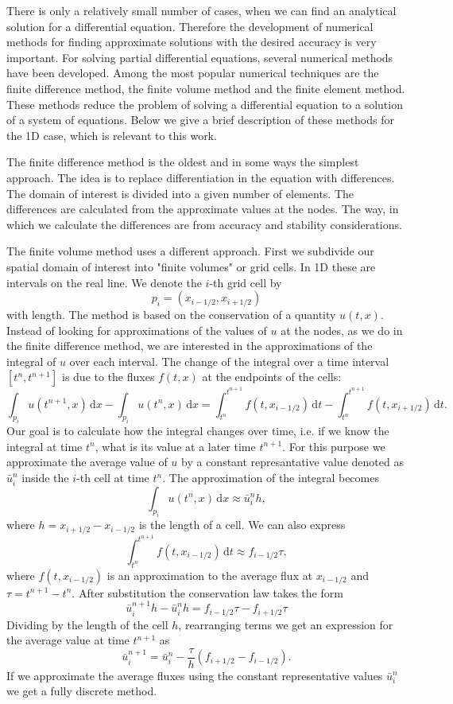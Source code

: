 \documentclass[a4paper,12pt,twoside]{report}%
\begin{document}
\par There is only a relatively small number of cases, when we can find an analytical solution for a differential equation. Therefore the development of numerical methods for finding approximate solutions with the desired accuracy is very important. For solving partial differential equations, several numerical methods have been developed. Among the most popular numerical techniques are the finite difference method, the finite volume method and the finite element method. These methods reduce the problem of solving a differential equation to a solution of a system of equations. Below we give a brief description of these methods for the 1D case, which is relevant to this work.

The finite difference method is the oldest and in some ways the simplest approach. The idea is to replace  differentiation in the equation with differences. The domain of interest is divided into a given number of elements. The differences are calculated from the approximate values at the nodes. The way, in which we calculate the differences are from accuracy and stability considerations.

The finite volume method uses a different approach. First we subdivide our spatial domain of interest into "finite volumes" or grid cells. In 1D these are intervals on the real line. We denote the $ i $-th grid cell by
\[
p_i = (x_{i-1/2}, x_{i+1/2})
\]
with length.
The method is based on the conservation of a quantity $ u(t, x) $. Instead of looking for approximations of the values of $ u $ at the nodes, as we do in the finite difference method, we are interested in the approximations of the integral of $ u $ over each interval. The change of the integral over a time interval $ [t^{n}, t^{n+1}] $ is due to the fluxes $ f(t, x) $ at the endpoints of the cells:
\[
\int_{p_i} u(t^{n+1}, x) \,\mathrm{d}x - \int_{p_i} u(t^{n}, x) \,\mathrm{d}x = 
\int_{t^{n}}^{t^{n+1}} f(t, x_{i-1/2}) \,\mathrm{d}t - \int_{t^{n}}^{t^{n+1}} f(t, x_{i+1/2}) \,\mathrm{d}t.
\]
Our goal is to calculate how the integral changes over time, i.e. if we know the integral at time $ t^n $, what is its value at a later time $ t^{n+1} $.
For this purpose we approximate the average value of $ u $ by a constant represantative value denoted as $ \bar{u}_i^n $ inside the $ i $-th cell at time $ t^n $. The approximation of the integral becomes
\[
\int_{p_i} u(t^n, x) \,\mathrm{d}x \approx \bar{u}_i^n h,
\]
where  $ h = x_{i+1/2} - x_{i-1/2} $ is the length of a cell.
We can also express
\[
\int_{t^{n}}^{t^{n+1}} f(t, x_{i-1/2}) \,\mathrm{d}t \approx f_{i-1/2} \tau,
\]
where $ f(t, x_{i-1/2}) $ is an approximation to the average flux at $ x_{i-1/2} $ and $ \tau = t^{n+1} - t^n $.
After substitution the conservation law takes the form
\[
\bar{u}_i^{n+1} h - \bar{u}_i^n h = f_{i-1/2} \tau -  f_{i+1/2} \tau
\]
Dividing by the length of the cell $ h $, rearranging terms we get an expression for the average value at time $ t^{n+1} $ as
\[
\bar{u}_i^{n+1} = \bar{u}_i^n - \frac{\tau}{h}(f_{i+1/2} - f_{i-1/2}).
\]
If we approximate the average fluxes using the constant representative values $ \bar{u}_i^{n} $ we get a fully discrete method.
\end{document}
